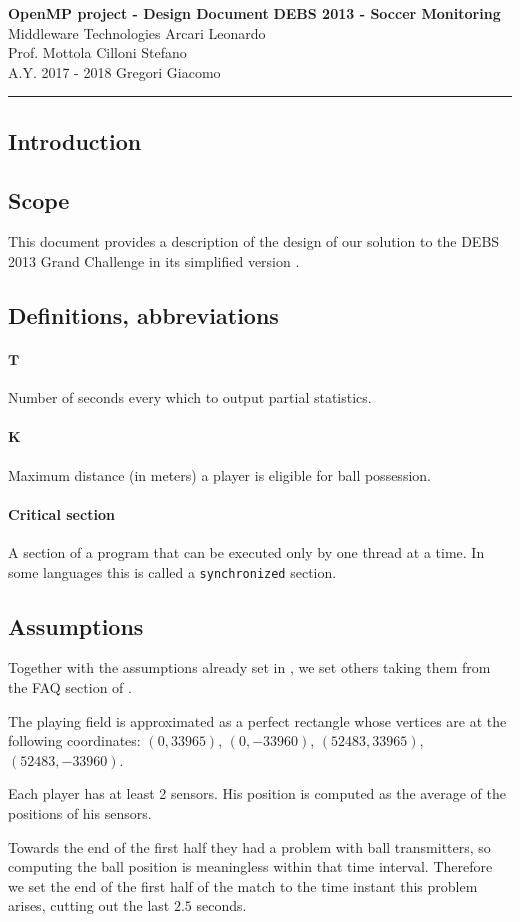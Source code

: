 \documentclass[a4paper, 11pt]{article}
\begin{document}
\noindent
\large\textbf{OpenMP project - Design Document} \hfill \textbf{DEBS 2013 - Soccer Monitoring} \\
\normalsize Middleware Technologies \hfill Arcari Leonardo \\
Prof. Mottola \hfill Cilloni Stefano \\
A.Y. 2017 - 2018 \hfill Gregori Giacomo
\noindent\rule{\columnwidth}{0.4pt}

\begin{multicols}{2}
\section{Introduction}
\subsection{Scope}
This document provides a description of the design of our solution to the DEBS 2013 Grand Challenge \cite{DEBS} in its simplified version \cite{Project}.

\subsection{Definitions, abbreviations}
\paragraph{$\mathbf{T}$} Number of seconds every which to output partial statistics.
\paragraph{$\mathbf{K}$} Maximum distance (in meters) a player is eligible for ball possession.
\paragraph{\textbf{Critical section}} A section of a program that can be executed only by one thread at a time. In some languages this is called a \texttt{synchronized} section.

\subsection{Assumptions}
Together with the assumptions already set in \cite{Project}, we set others taking them from the FAQ section of \cite{DEBS}.
\begin{enumerate*}[(a)]
    \item The playing field is approximated as a perfect rectangle whose vertices are at the following coordinates: $(0, 33965)$, $(0, -33960)$, $(52483, 33965)$, $(52483, -33960)$.
    \item Each player has at least 2 sensors. His position is computed as the average of the positions of his sensors.
    \item Towards the end of the first half they had a problem with ball transmitters, so computing the ball position is meaningless within that time interval. Therefore we set the end of the first half of the match to the time instant this problem arises, cutting out the last $2.5$ seconds.
\end{enumerate*}


\end{multicols}
\end{document}
